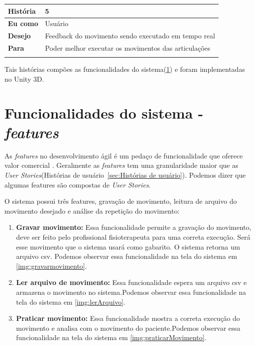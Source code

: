 \begin{table}[H]
\begin{tabular}{|l|l|}
\textbf{História} & 5                                                        \\ \hline
\textbf{Eu como}  & Usuário                                                  \\ \hline
\textbf{Desejo}   & Feedback do movimento sendo executado em tempo real                    \\ \hline
\textbf{Para}     & Poder melhor executar os movimentos das articulações           \\ \hline
\multicolumn{2}{|l|}{}                                                       \\ \hline

\end{tabular}
\end{table}

  Tais histórias compões as funcionalidades do sistema(\ref{sub:features}) e foram implementadas no Unity 3D.


 \section{Funcionalidades do sistema - \textit{features}}\label{sub:features}
     As \textit{features} no desenvolvimento ágil é um pedaço de funcionalidade que oferece valor comercial \cite{versionOne}.
   Geralmente as \textit{features} tem uma granularidade maior que as \textit{User Stories}(Histórias de usuário~\ref{sec:Histórias de usuário}).
   Podemos dizer que algumas features são compostas de \textit{User Stories}.

     O sistema possui três features, gravação de movimento, leitura de arquivo do movimento desejado e análise da repetição do movimento:
   \begin{enumerate}
     \item \textbf{Gravar movimento:} Essa funcionalidade permite a gravação do movimento, deve ser feito pelo profissional fisioterapeuta
     para uma correta execução. Será esse movimento que o sistema usará como gabarito. O sistema retorna um arquivo csv. Podemos observar essa funcionalidade
     na tela do sistema em \ref{img:gravarmovimento}.

     \item \textbf{Ler arquivo de movimento:} Essa funcionalidade espera um arquivo csv e armazena o movimento no sistema.Podemos observar essa funcionalidade
     na tela do sistema em \ref{img:lerArquivo}.

     \item \textbf{Praticar movimento:} Essa funcionalidade mostra a correta execução do movimento e analisa com o movimento do paciente.Podemos observar essa funcionalidade
     na tela do sistema em \ref{img:praticarMovimento}.

   \end{enumerate}

